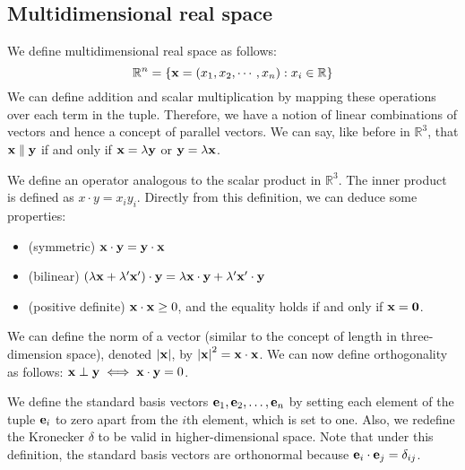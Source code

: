 \subsection{Multidimensional real space}
We define multidimensional real space as follows:
\[
	\mathbb R^n = \{ \vb x = (x_1, x_2, \cdots, x_n) : x_i \in \mathbb R \}
\]
We can define addition and scalar multiplication by mapping these operations over each term in the tuple.
Therefore, we have a notion of linear combinations of vectors and hence a concept of parallel vectors.
We can say, like before in \(\mathbb R^3\), that \(\vb x \parallel \vb y\) if and only if \(\vb x = \lambda \vb y\) or \(\vb y = \lambda \vb x\).

We define an operator analogous to the scalar product in \(\mathbb R^3\).
The inner product is defined as \(x \cdot y = x_i y_i\).
Directly from this definition, we can deduce some properties:
\begin{itemize}
	\item (symmetric) \(\vb x \cdot \vb y = \vb y \cdot \vb x\)
	\item (bilinear) \((\lambda \vb x + \lambda'\vb x')\cdot \vb y = \lambda \vb x\cdot \vb y + \lambda' \vb x' \cdot \vb y\)
	\item (positive definite) \(\vb x \cdot \vb x \geq 0\), and the equality holds if and only if \(\vb x = \vb 0\).
\end{itemize}

We can define the norm of a vector (similar to the concept of length in three-dimension space), denoted \(\abs {\vb x}\), by \(\abs{\vb x}^2 = \vb x \cdot \vb x\).
We can now define orthogonality as follows: \(\vb x \perp \vb y \iff \vb x \cdot \vb y = 0\).

We define the standard basis vectors \(\vb e_1, \vb e_2, \dots, \vb e_n\) by setting each element of the tuple \(\vb e_i\) to zero apart from the \(i\)th element, which is set to one.
Also, we redefine the Kronecker \(\delta\) to be valid in higher-dimensional space.
Note that under this definition, the standard basis vectors are orthonormal because \(\vb e_i \cdot \vb e_j = \delta_{ij}\).

